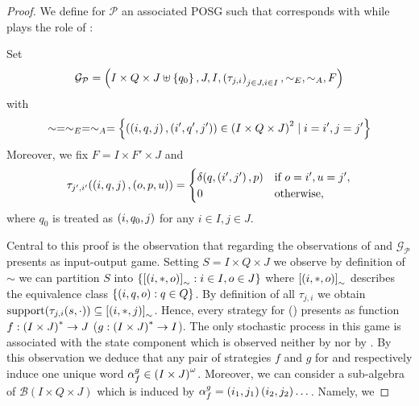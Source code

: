 \begin{proof}
  We define for $\mathcal{P}$ an associated \ac{POSG} such that \eve{} 
  corresponds with \outputp{} while \adam{} plays the role of :
  \begin{definition}
    Set
    \begin{equation*}
      \mathcal{G}_{\mathcal{P}} = \left(I\times Q\times J\uplus\left\{q_{0}\right\}, J,
        I, \left(\tau_{j,i}\right)_{j\in J,i\in I}, \sim_{E}, \sim_{A}, F\right)
    \end{equation*}
    with
    \begin{equation*}
      \sim = \sim_{E} = \sim_{A} = \left\{\left(\left(i, q, j\right), 
      \left(i', q', j'\right)\right)\in \left(I\times Q\times J\right)^{2}\mid i = i', j = j'\right\}
    \end{equation*}
    Moreover, we fix $F = I\times F'\times J$ and
    \begin{equation*}
      \tau_{j',i'}(\left(i, q, j\right), \left(o, p, u\right)) = \begin{cases}
        \delta(q, \left(i', j'\right), p)&\text{if }o = i', u = j',\\
        0&\text{otherwise},
      \end{cases}
    \end{equation*}
    where $q_{0}$ is treated as $\left(i, q_{0}, j\right)$ for any $i\in I, j\in J$.
  \end{definition}
  Central to this proof is the observation that regarding the observations of
  \eve{} and \adam{} $\mathcal{G}_{\mathcal{P}}$ presents as input-output game.
  Setting $S = I\times Q\times J$ we observe by definition of $\sim$ we can 
  partition $S$ into $\left\{\left[\left(i, *, o\right)\right]_{\sim}:i\in I, o\in J\right\}$ 
  where $\left[\left(i, *, o\right)\right]_{\sim}$ describes the equivalence class
  $\left\{\left(i, q, o\right):q\in Q\right\}$. By definition of all $\tau_{j,i}$ we obtain
  $\operatorname{support}(\tau_{j,i}(s, \cdot))\subseteq\left[\left(i,*,j\right)\right]_{\sim}$. Hence,
  every strategy for \eve{} (\adam{}) presents as function 
  $f:\left(I\times J\right)^{*}\rightarrow J$ 
  ($g:\left(I\times J\right)^{*}\rightarrow I$). The only stochastic process in this
  game is associated with the state component which is observed neither by 
  \eve{} nor by \adam{}. By this observation we deduce that any pair of 
  strategies $f$ and $g$ for \eve{} and \adam{} respectively induce one unique
  word $\alpha_{f}^{g}\in\left(I\times J\right)^{\omega}$. Moreover, we can consider
  a sub-algebra of $\mathcal{B}(I\times Q\times J)$ which is induced by 
  $\alpha_{f}^{g} = \left(i_{1}, j_{1}\right)\left(i_{2}, j_{2}\right)\dots$. Namely, we 

\end{proof}
